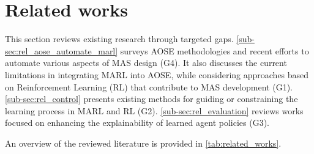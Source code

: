 \documentclass[pdflatex,sn-mathphys-num]{sn-jnl}%
\theoremstyle{thmstyleone}%
\theoremstyle{thmstyletwo}%
\theoremstyle{thmstylethree}%
\begin{document}
\section{Related works}\label{sec:related_works}

This section reviews existing research through targeted gaps. \autoref{sub-sec:rel_aose_automate_marl} surveys AOSE methodologies and recent efforts to automate various aspects of MAS design (G4). It also discusses the current limitations in integrating MARL into AOSE, while considering approaches based on Reinforcement Learning (RL) that contribute to MAS development (G1).
\autoref{sub-sec:rel_control} presents existing methods for guiding or constraining the learning process in MARL and RL (G2).
\autoref{sub-sec:rel_evaluation} reviews works focused on enhancing the explainability of learned agent policies (G3).

An overview of the reviewed literature is provided in \autoref{tab:related_works}.
\end{document}
